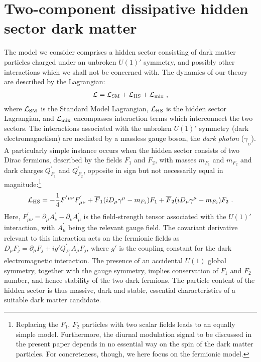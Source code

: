 \documentclass[12pt]{article}
\begin{document}
\section{Two-component dissipative hidden sector dark matter}

The model we consider comprises a hidden sector consisting of dark matter particles charged under an unbroken $U(1)'$ symmetry, and possibly other interactions which we shall not be concerned with. The dynamics of our theory are described by the Lagrangian:
%
\begin{eqnarray}
{\cal L} = {\cal L} _{\text{SM}} + {\cal L} _{\text{HS}} + {\cal L} _{\text{mix}} \ ,
\end{eqnarray}
%
where ${\cal L} _{\text{SM}}$ is the Standard Model Lagrangian, ${\cal L} _{\text{HS}}$ is the hidden sector Lagrangian, and ${\cal L} _{\text{mix}}$ encompasses interaction terms which interconnect the two sectors. The interactions associated with the unbroken $U(1)'$ symmetry (dark electromagnetism) are mediated by a massless gauge boson, the \textit{dark photon} ($\gamma _{_D}$). A particularly simple instance occurs when the hidden sector consists of two Dirac fermions, described by the fields $F_1$ and $F_2$, with masses $m _{F_1}$ and $m _{F_2}$ and dark charges $Q _{F_1} ^{'}$ and $Q _{F_2} ^{'}$, opposite in sign but not necessarily equal in magnitude:\footnote{Replacing the $F_1$, $F_2$ particles with two scalar fields leads to an equally simple model. Furthermore, the diurnal modulation signal to be discussed in the present paper depends in no essential way on the spin of the dark matter particles. For concreteness, though, we here focus on the fermionic model.}
%
\begin{eqnarray}
{\cal L} _{\text{HS}} = -\frac{1}{4}F ^{'\mu \nu}F ^{'} _{\mu \nu} + \overline{F}_1(iD _{\mu}\gamma ^{\mu} - m _{F_1})F_1 + \overline{F}_2(iD _{\mu}\gamma ^{\mu} - m _{F_2})F_2 \ .
\end{eqnarray}
%
Here, $F ^{'} _{\mu \nu} = \partial _{\mu}A ^{'} _{\nu} - \partial _{\nu}A ^{'} _{\mu}$ is the field-strength tensor associated with the $U(1)'$ interaction, with $A ^{'} _{\mu}$ being the relevant gauge field. The covariant derivative relevant to this interaction acts on the fermionic fields as $D _{\mu}F _j = \partial _{\mu}F _j + ig'Q ^{'} _{F_j}A ^{'} _{\mu}F _j$, where $g'$ is the coupling constant for the dark electromagnetic interaction. The presence of an accidental $U(1)$ global symmetry, together with the gauge symmetry, implies conservation of $F_1$ and $F_2$ number, and hence stability of the two dark fermions. The particle content of the hidden sector is thus massive, dark and stable, essential characteristics of a suitable dark matter candidate.
\end{document}
